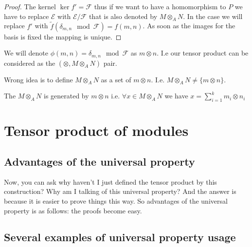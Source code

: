 \begin{lemma}
\begin{proof}
    The kernel $\ker f' = \mathcal{F}$ thus if we want to have a
    homomorphism to $P$ we have to replace $\mathcal{E}$ with
    $\mathcal{E}/\mathcal{F}$ that is also denoted by
    $M \otimes_A N$. In the case we will replace $f'$ with
    $\tilde{f}\left(\delta_{m,n} \mod \mathcal{F}\right) = f(m,n)$. As
    soon as the images for the basis is fixed the mapping is unique.
  \end{proof}
  \label{lem:tensorproductexistence}
\end{lemma}

We will denote $\phi\left(m,n\right) = \delta_{m,n} \mod \mathcal{F}$ as
$m \otimes n$. I.e our tensor product can be considered as the 
$\left(\otimes, M \otimes_A N\right)$ pair.


\begin{remark}
  Wrong idea is to define $M \otimes_A N$
  as a set of $m \otimes n$. I.e.
  $M \otimes_A N \neq \{m \otimes n\}$.
\end{remark}
The $M \otimes_A N$ is generated by $m \otimes n$ i.e.
$\forall x \in M \otimes_A N$ we have $x = \sum_{i = 1}^k m_i \otimes n_i$

\section{Tensor product of modules}

\subsection{Advantages of the universal property}
Now, you can ask  why haven't I just defined the tensor product by
this construction? Why am I talking of this universal property? 
And the answer is because it is easier to prove things this way. 
So advantages of the universal property is as follows: the proofs
become easy.

\subsection{Several examples of universal property usage}

